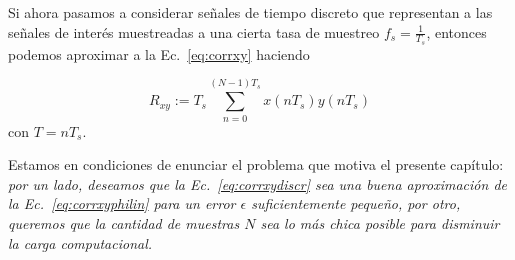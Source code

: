 \documentclass{article}
\begin{document}

Si ahora pasamos a considerar señales de tiempo discreto que representan a las señales de interés muestreadas a una cierta tasa de muestreo $f_s=\frac{1}{T_s}$, entonces podemos aproximar a la Ec.~\ref{eq:corrxy} haciendo

\begin{equation}\label{eq:corrxydiscr}
    R_{xy} := T_s \sum_{n=0}^{(N-1)T_s} x(n T_s) y(n T_s) 
\end{equation}
con $T=n T_s$. 

Estamos en condiciones de enunciar el problema que motiva el presente capítulo: \emph{por un lado, deseamos que la Ec.~\ref{eq:corrxydiscr} sea una buena aproximación de la Ec.~\ref{eq:corrxyphilin} para un error $\epsilon$ suficientemente pequeño, por otro, queremos que la cantidad de muestras $N$ sea lo más chica posible para disminuir la carga computacional.}
\end{document}
